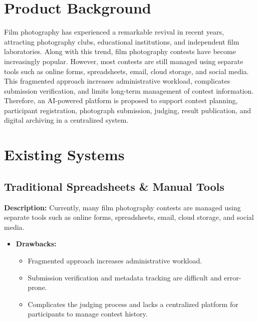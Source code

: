 \section{Product Background}
Film photography has experienced a remarkable revival in recent years, attracting photography clubs, educational institutions, and independent film laboratories. Along with this trend, film photography contests have become increasingly popular. However, most contests are still managed using separate tools such as online forms, spreadsheets, email, cloud storage, and social media. This fragmented approach increases administrative workload, complicates submission verification, and limits long-term management of contest information. Therefore, an AI-powered platform is proposed to support contest planning, participant registration, photograph submission, judging, result publication, and digital archiving in a centralized system.

\section{Existing Systems}
\subsection{Traditional Spreadsheets \& Manual Tools}
\textbf{Description:} Currently, many film photography contests are managed using separate tools such as online forms, spreadsheets, email, cloud storage, and social media.
\begin{itemize}
    \item \textbf{Drawbacks:}
    \begin{itemize}
        \item Fragmented approach increases administrative workload.
        \item Submission verification and metadata tracking are difficult and error-prone.
        \item Complicates the judging process and lacks a centralized platform for participants to manage contest history.
    \end{itemize}
\end{itemize}

